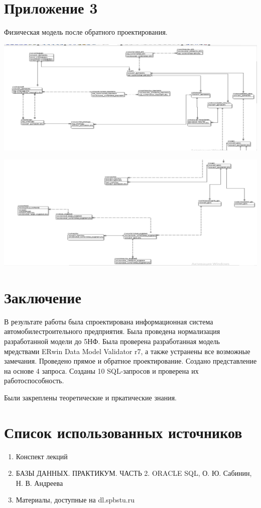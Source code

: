 \section{Приложение 3}

    Физическая модель после обратного проектирования.

    \includegraphics[width=14cm]{./screenshots/model/reverse1.png}

    \includegraphics[width=14cm]{./screenshots/model/reverse2.png}

\section{Заключение}
В результате работы была спроектирована информационная система автомобилестроительного предприятия.
Была проведена нормализация разработанной модели до 5НФ.
Была проверена разработанная модель мредствами ERwin Data Model Validator r7, а также устранены все возможные замечания.
Проведено прямое и обратное проектирование.
Создано представление на основе 4 запроса.
Созданы 10 SQL-запросов и проверена их работоспособность.

Были закреплены теоретические и пркатические знания.

\section{Список использованных источников}

\begin{enumerate}

    \item Конспект лекций
    \item БАЗЫ ДАННЫХ. ПРАКТИКУМ. ЧАСТЬ 2. ORACLE SQL, О. Ю. Сабинин, Н. В. Андреева
    \item Материалы, доступные на dl.spbstu.ru

\end{enumerate}

